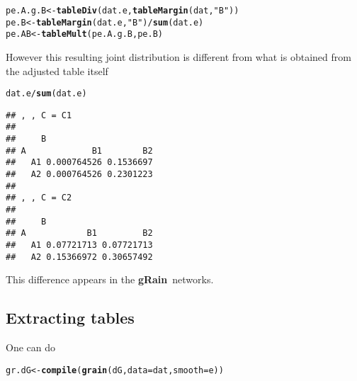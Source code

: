 \documentclass[10pt]{article}\usepackage[]{graphicx}\usepackage[]{color}
\makeatletter
\newcommand{\hlstr}[1]{\textcolor[rgb]{0.192,0.494,0.8}{#1}}%
\newcommand{\hlopt}[1]{\textcolor[rgb]{0,0,0}{#1}}%
\newcommand{\hlstd}[1]{\textcolor[rgb]{0.345,0.345,0.345}{#1}}%
\newcommand{\hlkwb}[1]{\textcolor[rgb]{0.69,0.353,0.396}{#1}}%
\newcommand{\hlkwc}[1]{\textcolor[rgb]{0.333,0.667,0.333}{#1}}%
\newcommand{\hlkwd}[1]{\textcolor[rgb]{0.737,0.353,0.396}{\textbf{#1}}}%
\newenvironment{kframe}{%
 \def\at@end@of@kframe{}%
 \ifinner\ifhmode%
  \def\at@end@of@kframe{\end{minipage}}%
  \begin{minipage}{\columnwidth}%
 \fi\fi%
 \def\FrameCommand##1{\hskip\@totalleftmargin \hskip-\fboxsep
 \colorbox{shadecolor}{##1}\hskip-\fboxsep
     \hskip-\linewidth \hskip-\@totalleftmargin \hskip\columnwidth}%
 \MakeFramed {\advance\hsize-\width
   \@totalleftmargin\z@ \linewidth\hsize
   \@setminipage}}%
 {\par\unskip\endMakeFramed%
 \at@end@of@kframe}
\newenvironment{knitrout}{}{} %
\def\grbn{{\bf gRain}}
\makeatother
\begin{document}
\begin{knitrout}
\color{fgcolor}\begin{kframe}
\begin{alltt}
\hlstd{pe.A.g.B} \hlkwb{<-} \hlkwd{tableDiv}\hlstd{(dat.e,} \hlkwd{tableMargin}\hlstd{(dat,} \hlstr{"B"}\hlstd{))}
\hlstd{pe.B} \hlkwb{<-} \hlkwd{tableMargin}\hlstd{(dat.e,} \hlstr{"B"}\hlstd{)}\hlopt{/}\hlkwd{sum}\hlstd{(dat.e)}
\hlstd{pe.AB}  \hlkwb{<-} \hlkwd{tableMult}\hlstd{( pe.A.g.B, pe.B )}
\end{alltt}
\end{kframe}
\end{knitrout}

However this resulting joint distribution is different from what is
obtained from the adjusted table itself
\begin{knitrout}
\color{fgcolor}\begin{kframe}
\begin{alltt}
\hlstd{dat.e} \hlopt{/} \hlkwd{sum}\hlstd{(dat.e)}
\end{alltt}
\begin{verbatim}
## , , C = C1
## 
##     B
## A             B1        B2
##   A1 0.000764526 0.1536697
##   A2 0.000764526 0.2301223
## 
## , , C = C2
## 
##     B
## A            B1         B2
##   A1 0.07721713 0.07721713
##   A2 0.15366972 0.30657492
\end{verbatim}
\end{kframe}
\end{knitrout}

This difference appears in the \grbn\ networks.

\subsection{Extracting tables}
\label{sec:extracting-tables}

One can do
\begin{knitrout}
\color{fgcolor}\begin{kframe}
\begin{alltt}
\hlstd{gr.dG} \hlkwb{<-} \hlkwd{compile}\hlstd{(}\hlkwd{grain}\hlstd{(dG,} \hlkwc{data}\hlstd{=dat,} \hlkwc{smooth}\hlstd{=e))}
\end{alltt}


{\ttfamily\noindent\bfseries\color{errorcolor}{\#\# Error in compileCPT(object): A list is expected}}\end{kframe}
\end{knitrout}
\end{document}
